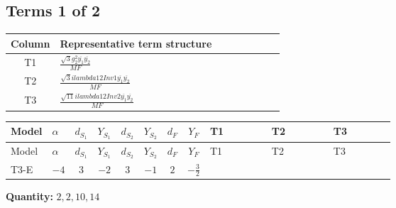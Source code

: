 \documentclass[8pt]{article}
\begin{document}
\begin{landscape}
\subsection*{Terms 1 of 2}
\begin{center}
\begin{tabular}{@{}c >{\raggedright\arraybackslash}p{0.82\linewidth}@{}}
\toprule
Column & Representative term structure \\
\midrule
T1 & \(\displaystyle \frac{\sqrt{3} g_{2}^{2} \overline{y_{1}} \overline{y_{2}}}{MF}\) \\
\midrule
T2 & \(\displaystyle \frac{\sqrt{3} i lambda12Inv1 \overline{y_{1}} \overline{y_{2}}}{MF}\) \\
\midrule
T3 & \(\displaystyle \frac{\sqrt{11} i lambda12Inv2 \overline{y_{1}} \overline{y_{2}}}{MF}\) \\
\midrule
\bottomrule
\end{tabular}
\end{center}
\smallskip
\tiny
\begin{longtable}{@{}llcccccc >{\raggedright\arraybackslash}p{0.21\linewidth} >{\raggedright\arraybackslash}p{0.21\linewidth} >{\raggedright\arraybackslash}p{0.21\linewidth}@{}}
\toprule
Model & $\alpha$ & $d_{S_1}$ & $Y_{S_1}$ & $d_{S_2}$ & $Y_{S_2}$ & $d_F$ & $Y_F$ & T1 & T2 & T3 \\
\midrule
\endfirsthead
\toprule
Model & $\alpha$ & $d_{S_1}$ & $Y_{S_1}$ & $d_{S_2}$ & $Y_{S_2}$ & $d_F$ & $Y_F$ & T1 & T2 & T3 \\
\midrule
\endhead
T3-E & $-4$ & $3$ & $-2$ & $3$ & $-1$ & $2$ & $-\frac{3}{2}$ & \scriptsize\adjustbox{max width=\linewidth}{$\begin{gathered} - \frac{\sqrt{3} g_{2}^{2} \overline{y_{1}} \overline{y_{2}}}{6 MF}\end{gathered}$} & \scriptsize\adjustbox{max width=\linewidth}{$\begin{gathered} - \frac{\sqrt{3} i lambda12Inv1 \overline{y_{1}} \overline{y_{2}}}{6 MF}\end{gathered}$} & \scriptsize\adjustbox{max width=\linewidth}{$\begin{gathered} \frac{3 \sqrt{11} i lambda12Inv2 \overline{y_{1}} \overline{y_{2}}}{22 MF}\end{gathered}$} \\
\midrule
\bottomrule
\end{longtable}
\clearpage
\noindent\textbf{Quantity: }$\mathrm{2,2,10,14}$\par\smallskip

\end{landscape}
\end{document}
